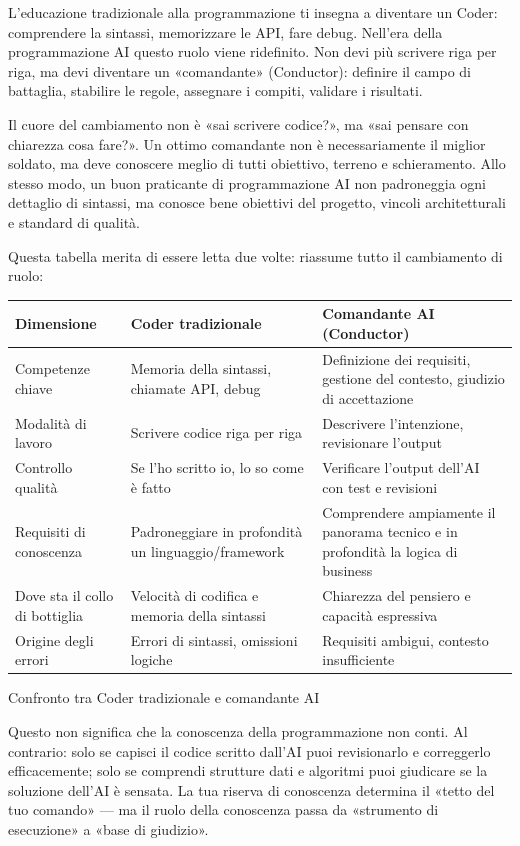 
L'educazione tradizionale alla programmazione ti insegna a diventare un Coder: comprendere la sintassi, memorizzare le API, fare debug. Nell'era della programmazione AI questo ruolo viene ridefinito. Non devi più scrivere riga per riga, ma devi diventare un «comandante» (Conductor): definire il campo di battaglia, stabilire le regole, assegnare i compiti, validare i risultati.

Il cuore del cambiamento non è «sai scrivere codice?», ma «sai pensare con chiarezza cosa fare?». Un ottimo comandante non è necessariamente il miglior soldato, ma deve conoscere meglio di tutti obiettivo, terreno e schieramento. Allo stesso modo, un buon praticante di programmazione AI non padroneggia ogni dettaglio di sintassi, ma conosce bene obiettivi del progetto, vincoli architetturali e standard di qualità.

Questa tabella merita di essere letta due volte: riassume tutto il cambiamento di ruolo:

\begin{center}
\begin{tabularx}{\linewidth}{|X|X|X|}
\hline
\textbf{Dimensione} & \textbf{Coder tradizionale} & \textbf{Comandante AI (Conductor)} \tabularnewline
\hline
Competenze chiave & Memoria della sintassi, chiamate API, debug & Definizione dei requisiti, gestione del contesto, giudizio di accettazione \tabularnewline
Modalità di lavoro & Scrivere codice riga per riga & Descrivere l'intenzione, revisionare l'output \tabularnewline
Controllo qualità & Se l'ho scritto io, lo so come è fatto & Verificare l'output dell'AI con test e revisioni \tabularnewline
Requisiti di conoscenza & Padroneggiare in profondità un linguaggio/framework & Comprendere ampiamente il panorama tecnico e in profondità la logica di business \tabularnewline
Dove sta il collo di bottiglia & Velocità di codifica e memoria della sintassi & Chiarezza del pensiero e capacità espressiva \tabularnewline
Origine degli errori & Errori di sintassi, omissioni logiche & Requisiti ambigui, contesto insufficiente \tabularnewline
\hline
\end{tabularx}
\end{center}

\begin{center}\small\color{gray}Confronto tra Coder tradizionale e comandante AI\end{center}

Questo non significa che la conoscenza della programmazione non conti. Al contrario: solo se capisci il codice scritto dall'AI puoi revisionarlo e correggerlo efficacemente; solo se comprendi strutture dati e algoritmi puoi giudicare se la soluzione dell'AI è sensata. La tua riserva di conoscenza determina il «tetto del tuo comando» — ma il ruolo della conoscenza passa da «strumento di esecuzione» a «base di giudizio».

